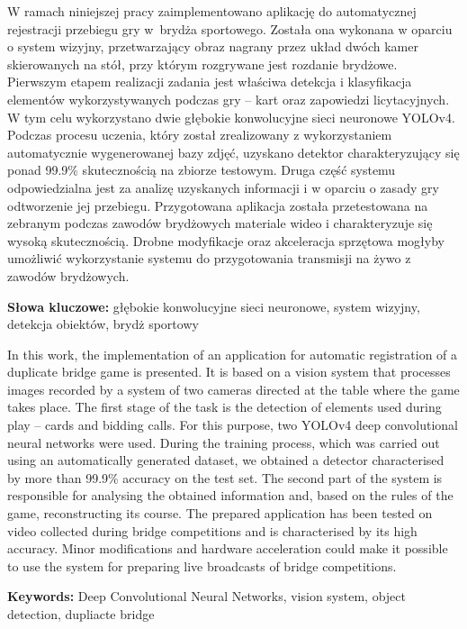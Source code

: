 \documentclass[12pt]{aghdpl}
\author{Michał Machura}
\date{2021}
\newenvironment{abstractpage}
{\cleardoublepage\vspace*{\fill}\thispagestyle{empty}}
{\vfill\cleardoublepage}
\renewenvironment{abstract}[1]
{\bigskip\selectlanguage{#1}%
    \begin{center}\bfseries\abstractname\end{center}}
{\par\bigskip}
\begin{document}
	\titlepages
	
	\begin{abstractpage}
    \begin{abstract}{polish}
        W ramach niniejszej pracy zaimplementowano aplikację do automatycznej rejestracji przebiegu gry w~brydża sportowego. Została ona wykonana w oparciu o system wizyjny, przetwarzający obraz nagrany przez układ dwóch kamer skierowanych na stół, przy którym rozgrywane jest rozdanie brydżowe. 
        Pierwszym etapem realizacji zadania jest właściwa detekcja i klasyfikacja elementów wykorzystywanych podczas gry -- kart oraz zapowiedzi licytacyjnych. W tym celu wykorzystano dwie głębokie konwolucyjne sieci neuronowe YOLOv4. Podczas procesu uczenia, który został zrealizowany z wykorzystaniem automatycznie wygenerowanej bazy zdjęć, uzyskano detektor charakteryzujący się ponad 99.9\% skutecznością na zbiorze testowym. Druga część systemu odpowiedzialna jest za analizę uzyskanych informacji i w oparciu o zasady gry odtworzenie jej przebiegu.
        Przygotowana aplikacja została przetestowana na zebranym podczas zawodów brydżowych materiale wideo i charakteryzuje się wysoką skutecznością. Drobne modyfikacje oraz akceleracja sprzętowa mogłyby umożliwić wykorzystanie systemu do przygotowania transmisji na żywo z zawodów brydżowych. 
       
        \bigskip
        \textbf{Słowa kluczowe:}   głębokie konwolucyjne sieci neuronowe, system wizyjny, detekcja obiektów, brydż sportowy
       
       
    \end{abstract}
    \bigskip
    \bigskip
    \bigskip
    \bigskip
    \bigskip
    \bigskip
    \bigskip
    \bigskip
    \bigskip
    \bigskip
    \bigskip
    \begin{abstract}{english}
        In this work, the implementation of an application for automatic registration of a duplicate bridge game is presented. It is based on a vision system that processes images recorded by a system of two cameras directed at the table where the game takes place.
        The first stage of the task is the detection of elements used during play -- cards and bidding calls. For this purpose, two YOLOv4 deep convolutional neural networks were used. During the training process, which was carried out using an automatically generated dataset, we obtained a detector characterised by more than 99.9\% accuracy on the test set. The second part of the system is responsible for analysing the obtained information and, based on the rules of the game, reconstructing its course.
        The prepared application has been tested on video collected during bridge competitions and is characterised by its high accuracy. Minor modifications and hardware acceleration could make it possible to use the system for preparing live broadcasts of bridge competitions. 
        
        \bigskip
       
        \textbf{Keywords:} Deep Convolutional Neural Networks, vision system, object detection, dupliacte bridge
    \end{abstract}
\end{abstractpage}
\end{document}

